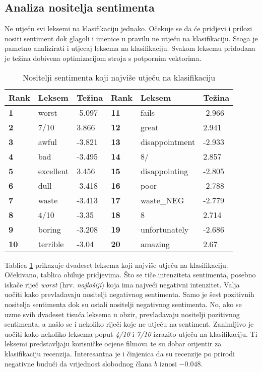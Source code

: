 \documentclass[times, utf8, zavrsni, numeric]{fer}
\begin{document}
\subsection{Analiza nositelja sentimenta}
Ne utječu svi leksemi na klasifikaciju jednako. Očekuje se da će pridjevi i prilozi nositi
sentiment dok glagoli i imenice u pravilu ne utječu na klasifikaciju.
Stoga je pametno analizirati i utjecaj leksema na klasifikaciju. Svakom leksemu pridodana je težina
dobivena optimizacijom stroja s potpornim vektorima.

\begin{table}
    \center
    \begin{tabular}{| >{\bfseries}l | l | l | >{\bfseries}l | l | l |}
    \hline
    Rank & Leksem & Težina & Rank & Leksem & Težina\\ \hline
    1 & worst & -5.097 & 11 & fails & -2.966\\ \hline
    2 & 7/10 & 3.866 & 12 & great & 2.941\\ \hline
    3 & awful & -3.821 & 13 & disappointment & -2.933\\ \hline
    4 & bad & -3.495 & 14 & 8/ & 2.857\\ \hline
    5 & excellent & 3.456 & 15 & disappointing & -2.805\\ \hline
    6 & dull & -3.418 & 16 & poor & -2.788\\ \hline
    7 & waste & -3.413 & 17 & waste\_NEG & -2.779\\ \hline
    8 & 4/10 & -3.35 & 18 & 8 & 2.714\\ \hline
    9 & boring & -3.208 & 19 & unfortunately & -2.686\\ \hline
    10 & terrible & -3.04 & 20 & amazing & 2.67\\
    \hline
    \end{tabular}
    \caption{Nositelji sentimenta koji najviše utječu na klasifikaciju}
    \label{tab:noistelji}
\end{table}

\par Tablica \ref{tab:noistelji} prikazuje dvadeset leksema koji najviše utječu na klasifikaciju.
Očekivano, tablica obiluje pridjevima. Što se tiče intenziteta sentimenta, posebno iskače riječ
\textit{worst} (hrv. \textit{najlošiji}) koja ima najveći negativni intenzitet. 
Valja uočiti kako prevladavaju nositelji negativnog sentimenta. Samo je šest pozitivnih nositelja 
sentimenta dok su ostali nositelji negativnog sentimenta. 
No, ako se uzme svih dvadeset tisuća leksema u obzir, prevladavaju nositelji pozitivnog sentimenta,
a našlo se i nekoliko riječi koje ne utječu na sentiment.
Zanimljivo je uočiti kako nekoliko leksema
poput \textit{4/10} i \textit{7/10} izrazito utječu na klasifikaciju.
Ti leksemi predstavljaju korisničke ocjene filmova te su dobar orijentir za klasifikaciju recenzija.
Interesantna je i činjenica da su recenzije po prirodi negativne budući da vrijednost slobodnog
člana $b$ iznosi $-0.048$.
\end{document}
